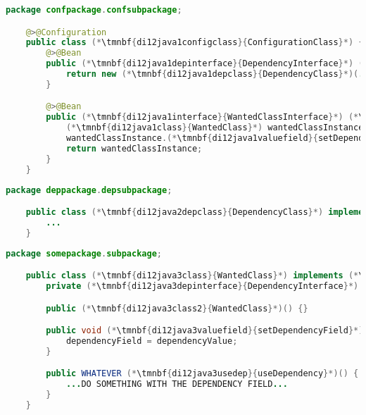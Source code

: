 \enlargethispage{20mm}
\thispagestyle{empty}
\begin{lstlisting}[language=Java, title={Configuration class}]
    package confpackage.confsubpackage;

    @>@Configuration
    public class (*\tmnbf{di12java1configclass}{ConfigurationClass}*) {
        @>@Bean
        public (*\tmnbf{di12java1depinterface}{DependencyInterface}*) (*\tmnbf{di12java1depbeanid}{dependencyBeanMethod}*)() {
            return new (*\tmnbf{di12java1depclass}{DependencyClass}*)(...);
        }

        @>@Bean
        public (*\tmnbf{di12java1interface}{WantedClassInterface}*) (*\tmnbf{di12java1beanid}{wantedBeanMethod}*)() {
            (*\tmnbf{di12java1class}{WantedClass}*) wantedClassInstance = new (*\tmnbf{di12java1class2}{WantedClass}*)();
            wantedClassInstance.(*\tmnbf{di12java1valuefield}{setDependencyField}*)((*\tmnbf{di12java1depbeanid2}{dependencyBeanMethod}*)());
            return wantedClassInstance;
        }
    }
\end{lstlisting}
\begin{lstlisting}[language=Java, title={Dependency class}]
    package deppackage.depsubpackage;

    public class (*\tmnbf{di12java2depclass}{DependencyClass}*) implements (*\tmnbf{di12java2depinterface}{DependencyInterface}*) {
        ...
    }
\end{lstlisting}
\begin{lstlisting}[language=Java, title={Wanted class with the zero--parameter constructor and the setter method}]
    package somepackage.subpackage;

    public class (*\tmnbf{di12java3class}{WantedClass}*) implements (*\tmnbf{di12java3interface}{WantedClassInterface}*) {
        private (*\tmnbf{di12java3depinterface}{DependencyInterface}*) dependencyField;

        public (*\tmnbf{di12java3class2}{WantedClass}*)() {}

        public void (*\tmnbf{di12java3valuefield}{setDependencyField}*)((*\tmnbf{di12java3depinterface2}{DependencyInterface}*) dependencyField){
            dependencyField = dependencyValue;
        }

        public WHATEVER (*\tmnbf{di12java3usedep}{useDependency}*)() {
            ...DO SOMETHING WITH THE DEPENDENCY FIELD...
        }
    }
\end{lstlisting}
